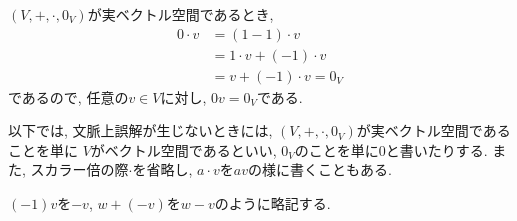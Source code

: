 \begin{remark}
  $(V,+,\cdot,0_V)$が実ベクトル空間であるとき,
  \begin{align*}
    0\cdot v
    &=(1-1)\cdot v\\
    &=1\cdot v + (-1)\cdot v\\
    &=v+ (-1)\cdot v= 0_V
  \end{align*}
  であるので,
  任意の$v\in V$に対し, $0v=0_V$である.
\end{remark}
\begin{remark}
  以下では, 文脈上誤解が生じないときには,
  $(V,+,\cdot,0_V)$が実ベクトル空間であることを単に
  $V$がベクトル空間であるといい,
  $0_V$のことを単に$0$と書いたりする.
  また, スカラー倍の際$\cdot$を省略し, $a\cdot v$を$av$の様に書くこともある.
\end{remark}
\begin{remark}
  $(-1)v$を$-v$, $w+(-v)$を$w-v$のように略記する.
\end{remark}


